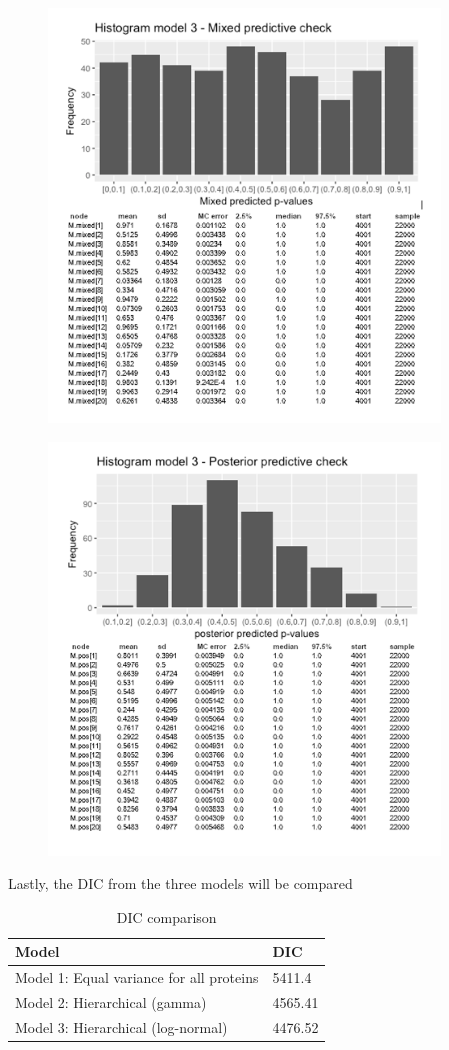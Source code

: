 \documentclass{article}
\begin{document}
\begin{figure}[ht!]
\centering
\includegraphics[width=10.4cm]{figures/model3_posmixpred.png}
\end{figure}

\begin{figure}[ht!]
\centering
\includegraphics[width=10.4cm]{figures/model3_pospred.png}
\end{figure}

\newpage
Lastly, the DIC from the three models will be compared


\begin{table}[ht!]
\centering
\caption{DIC comparison}
\label{my-label}
\begin{tabular}{|l|l|}
\hline
Model                           & DIC \\ \hline
Model 1: Equal variance for all proteins & 5411.4   \\ \hline
Model 2: Hierarchical (gamma)	      & 4565.41   \\ \hline
Model 3: Hierarchical (log-normal)            & 4476.52   \\ \hline
\end{tabular}
\end{table}
\end{document}
